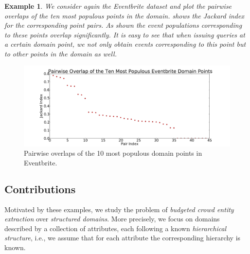 \documentclass{vldb}
\newtheorem{example}{Example}
\begin{document}
\begin{example}
We consider again the Eventbrite dataset and plot the pairwise overlaps of the ten most populous points in the domain.  shows the Jackard index for the corresponding point pairs. As shown the event populations corresponding to these points overlap significantly. It is easy to see that when issuing queries at a certain domain point, we not only obtain events corresponding to this point but to other points in the domain as well. 
\end{example}

\begin{figure}
	\begin{center}
	\includegraphics[trim=55 0 62 0,clip,scale=0.2]{figs/overlaps.pdf}
	\caption{Pairwise overlaps of the 10 most populous domain points in Eventbrite.}
	\label{fig:eventbriteover}
	\vspace{-20pt}
	\end{center}
\end{figure}

\subsection{Contributions}
\label{sec:contributions}
Motivated by these examples, we study the problem of {\em budgeted crowd entity extraction} over {\em structured domains}. More precisely, we focus on domains described by a collection of attributes, each following a known {\em hierarchical structure}, i.e., we assume that for each attribute the corresponding hierarchy is known.
\end{document}
